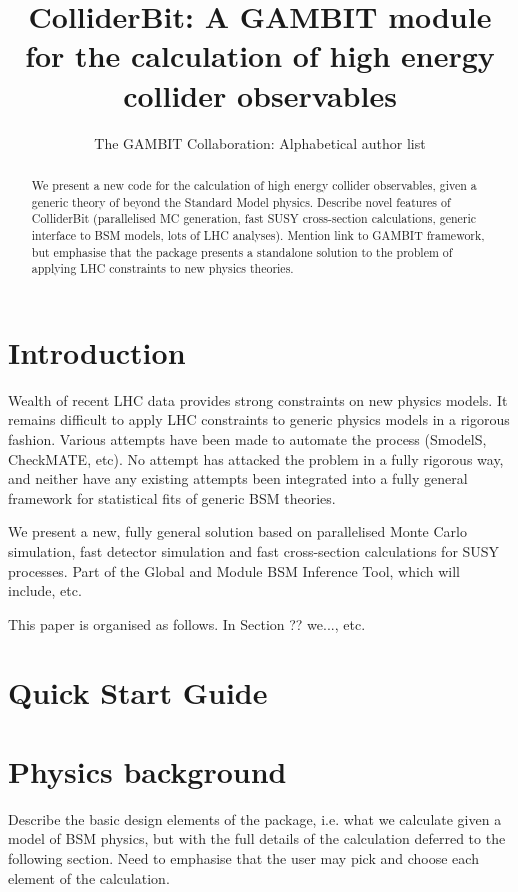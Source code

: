 \documentclass[11pt,a4paper]{article}
\title{ColliderBit: A GAMBIT module for the calculation of high energy collider observables}
\author{The GAMBIT Collaboration: Alphabetical author list} %
\begin{document}
\maketitle

\begin{abstract}
We present a new code for the calculation of high energy collider observables, given a generic theory of beyond the Standard Model physics. Describe novel features of ColliderBit (parallelised MC generation, fast SUSY cross-section calculations, generic interface to BSM models, lots of LHC analyses). Mention link to GAMBIT framework, but emphasise that the package presents a standalone solution to the problem of applying LHC constraints to new physics theories.
\end{abstract}

\section{Introduction}

Wealth of recent LHC data provides strong constraints on new physics models. It remains difficult to apply LHC constraints to generic physics models in a rigorous fashion. Various attempts have been made to automate the process (SmodelS, CheckMATE, etc). No attempt has attacked the problem in a fully rigorous way, and neither have any existing attempts been integrated into a fully general framework for statistical fits of generic BSM theories. 

We present a new, fully general solution based on parallelised Monte Carlo simulation, fast detector simulation and fast cross-section calculations for SUSY processes. Part of the Global and Module BSM Inference Tool, which will include, etc. 

This paper is organised as follows. In Section ?? we..., etc. 

\section{Quick Start Guide}

\section{Physics background}
Describe the basic design elements of the package, i.e. what we calculate given a model of BSM physics, but with the full details of the calculation deferred to the following section. Need to emphasise that the user may pick and choose each element of the calculation.
\end{document}
